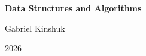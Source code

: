 \documentclass[11pt]{article}
\theoremstyle{definition}
\theoremstyle{plain}
\theoremstyle{remark}
\begin{document}
\begin{titlepage}
    \centering
    \vspace*{3cm}
    {\Huge\bfseries Data Structures and Algorithms \par}
    \vspace{0.5cm}
    \vspace{1.5cm}
    {\Large Gabriel Kinshuk \par}
    \vfill
    {\large 2026 \par}
\end{titlepage}

\tableofcontents
\clearpage

\newpage


\newpage

\newpage

\newpage

\newpage

\newpage

\end{document}
